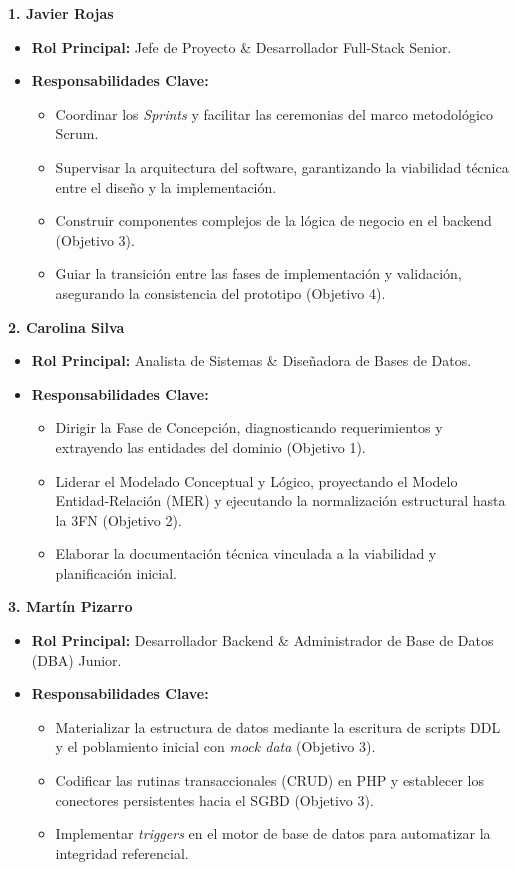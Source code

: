 \noindent \textbf{1. Javier Rojas}
\begin{itemize}
	\item \textbf{Rol Principal:} Jefe de Proyecto \& Desarrollador Full-Stack Senior.
	\item \textbf{Responsabilidades Clave:}
	\begin{itemize}
		\item Coordinar los \textit{Sprints} y facilitar las ceremonias del marco metodológico Scrum.
		\item Supervisar la arquitectura del software, garantizando la viabilidad técnica entre el diseño y la implementación.
		\item Construir componentes complejos de la lógica de negocio en el backend (Objetivo 3).
		\item Guiar la transición entre las fases de implementación y validación, asegurando la consistencia del prototipo (Objetivo 4).
	\end{itemize}
\end{itemize}
\vspace{0.5em}

\noindent \textbf{2. Carolina Silva}
\begin{itemize}
	\item \textbf{Rol Principal:} Analista de Sistemas \& Diseñadora de Bases de Datos.
	\item \textbf{Responsabilidades Clave:}
	\begin{itemize}
		\item Dirigir la Fase de Concepción, diagnosticando requerimientos y extrayendo las entidades del dominio (Objetivo 1).
		\item Liderar el Modelado Conceptual y Lógico, proyectando el Modelo Entidad-Relación (MER) y ejecutando la normalización estructural hasta la 3FN (Objetivo 2).
		\item Elaborar la documentación técnica vinculada a la viabilidad y planificación inicial.
	\end{itemize}
\end{itemize}
\vspace{0.5em}

\noindent \textbf{3. Martín Pizarro}
\begin{itemize}
	\item \textbf{Rol Principal:} Desarrollador Backend \& Administrador de Base de Datos (DBA) Junior.
	\item \textbf{Responsabilidades Clave:}
	\begin{itemize}
		\item Materializar la estructura de datos mediante la escritura de scripts DDL y el poblamiento inicial con \textit{mock data} (Objetivo 3).
		\item Codificar las rutinas transaccionales (CRUD) en PHP y establecer los conectores persistentes hacia el SGBD (Objetivo 3).
		\item Implementar \textit{triggers} en el motor de base de datos para automatizar la integridad referencial.
	\end{itemize}
\end{itemize}
\vspace{0.5em}

